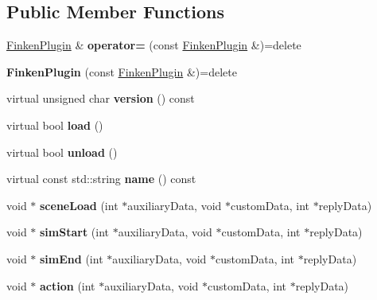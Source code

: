 \subsection*{Public Member Functions}
\begin{DoxyCompactItemize}
\item 
\hyperlink{classFinkenPlugin}{Finken\+Plugin} \& {\bfseries operator=} (const \hyperlink{classFinkenPlugin}{Finken\+Plugin} \&)=delete\hypertarget{classFinkenPlugin_a3ebea1e19535491b5db16c7f43df8e79}{}\label{classFinkenPlugin_a3ebea1e19535491b5db16c7f43df8e79}

\item 
{\bfseries Finken\+Plugin} (const \hyperlink{classFinkenPlugin}{Finken\+Plugin} \&)=delete\hypertarget{classFinkenPlugin_a5f4bc33c0d0bb05ca4f78090c7a2fda9}{}\label{classFinkenPlugin_a5f4bc33c0d0bb05ca4f78090c7a2fda9}

\item 
virtual unsigned char {\bfseries version} () const \hypertarget{classFinkenPlugin_a046a229dfbc8185bac916ad2e49ec865}{}\label{classFinkenPlugin_a046a229dfbc8185bac916ad2e49ec865}

\item 
virtual bool {\bfseries load} ()\hypertarget{classFinkenPlugin_afbe5d82635afe4b0c407de4724e8ee14}{}\label{classFinkenPlugin_afbe5d82635afe4b0c407de4724e8ee14}

\item 
virtual bool {\bfseries unload} ()\hypertarget{classFinkenPlugin_ae9c984b362c6a828206fa6201291851c}{}\label{classFinkenPlugin_ae9c984b362c6a828206fa6201291851c}

\item 
virtual const std\+::string {\bfseries name} () const \hypertarget{classFinkenPlugin_a1a7d0d65f88654c37b282e07d36417ec}{}\label{classFinkenPlugin_a1a7d0d65f88654c37b282e07d36417ec}

\item 
void $\ast$ {\bfseries scene\+Load} (int $\ast$auxiliary\+Data, void $\ast$custom\+Data, int $\ast$reply\+Data)\hypertarget{classFinkenPlugin_a82c0cd5fa1b9fdb5f5a625458a9b545b}{}\label{classFinkenPlugin_a82c0cd5fa1b9fdb5f5a625458a9b545b}

\item 
void $\ast$ {\bfseries sim\+Start} (int $\ast$auxiliary\+Data, void $\ast$custom\+Data, int $\ast$reply\+Data)\hypertarget{classFinkenPlugin_a142f62305fcc926bb6cf86744edbb82b}{}\label{classFinkenPlugin_a142f62305fcc926bb6cf86744edbb82b}

\item 
void $\ast$ {\bfseries sim\+End} (int $\ast$auxiliary\+Data, void $\ast$custom\+Data, int $\ast$reply\+Data)\hypertarget{classFinkenPlugin_aec5f5cf14ca485055ccc321a716780a4}{}\label{classFinkenPlugin_aec5f5cf14ca485055ccc321a716780a4}

\item 
void $\ast$ {\bfseries action} (int $\ast$auxiliary\+Data, void $\ast$custom\+Data, int $\ast$reply\+Data)\hypertarget{classFinkenPlugin_a00d8bcdd7c4b28eb76712b84f512b12b}{}\label{classFinkenPlugin_a00d8bcdd7c4b28eb76712b84f512b12b}

\end{DoxyCompactItemize}
